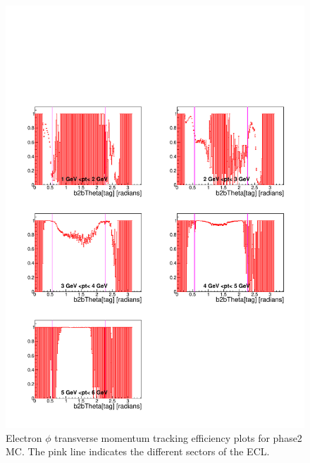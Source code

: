 \documentclass[a4paper,11pt,twosided,final,german,openbib,pdftex,listof=totoc,bibliography=totoc]{scrbook}
\begin{document}
\begin{appendix}
\begin{figure}[!htbp]
	\centering
	\includegraphics[width=\textwidth]{Plots/master/xPtMThetaem_MC}
	\caption[Transverse Momentum $\theta$ Electron Efficiency Phase2 MC]{Electron $\phi$ transverse momentum tracking efficiency plots for phase2 MC. The pink line indicates the different sectors of the ECL.}
	\label{plt:PtMThetaem_MC}
\end{figure}



\end{appendix}
\end{document}
